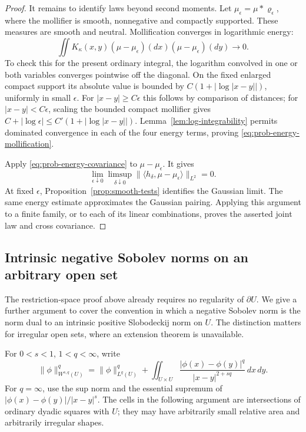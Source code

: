 \begin{proof}
It remains to identify laws beyond second moments. Let
\(\mu_\epsilon=\mu*\varrho_\epsilon\), where the mollifier is smooth,
nonnegative and compactly supported. These measures are smooth and
neutral. Mollification converges in logarithmic energy:
\begin{equation}\label{eq:prob-energy-mollification}
 \iint K_\kappa(x,y)
       (\mu-\mu_\epsilon)(dx)(\mu-\mu_\epsilon)(dy)
       \longrightarrow0.
\end{equation}
To check this for the present ordinary integral, the logarithm convolved
in one or both variables converges pointwise off the diagonal. On the
fixed enlarged compact support its absolute value is bounded by
\(C(1+|\log|x-y||)\), uniformly in small \(\epsilon\).
For \(|x-y|\ge C\epsilon\) this follows by comparison of distances;
for \(|x-y|<C\epsilon\), scaling the bounded compact mollifier gives
\(C+|\log\epsilon|\le C'(1+|\log|x-y||)\).
Lemma~\ref{lem:log-integrability} permits dominated convergence in each
of the four energy terms, proving
\eqref{eq:prob-energy-mollification}.

Apply \eqref{eq:prob-energy-covariance} to
\(\mu-\mu_\epsilon\). It gives
\[
 \lim_{\epsilon\downarrow0}\limsup_{\delta\downarrow0}
 \|\langle h_\delta,\mu-\mu_\epsilon\rangle\|_{L^2}=0.
\]
At fixed \(\epsilon\), Proposition~\ref{prop:smooth-tests} identifies
the Gaussian limit. The same energy estimate approximates the Gaussian
pairing. Applying this argument to a finite family, or to each of its
linear combinations, proves the asserted joint law and cross covariance.
\end{proof}

\subsection{Intrinsic negative Sobolev norms on an arbitrary open set}

The restriction-space proof above already requires no regularity of
\(\partial U\). We give a further argument to cover the convention in
which a negative Sobolev norm is the norm dual to an intrinsic positive
Slobodeckij norm on \(U\). The distinction matters for irregular open
sets, where an extension theorem is unavailable.

For \(0<s<1\), \(1<q<\infty\), write
\[
 \|\phi\|_{W^{s,q}(U)}^q
 =\|\phi\|_{L^q(U)}^q+
   \iint_{U\times U}
       \frac{|\phi(x)-\phi(y)|^q}{|x-y|^{2+sq}}\,dx\,dy.
\]
For \(q=\infty\), use the sup norm and the essential supremum of
\(|\phi(x)-\phi(y)|/|x-y|^s\).
The cells in the following argument are intersections of ordinary
dyadic squares with \(U\); they may have arbitrarily small relative
area and arbitrarily irregular shapes.

